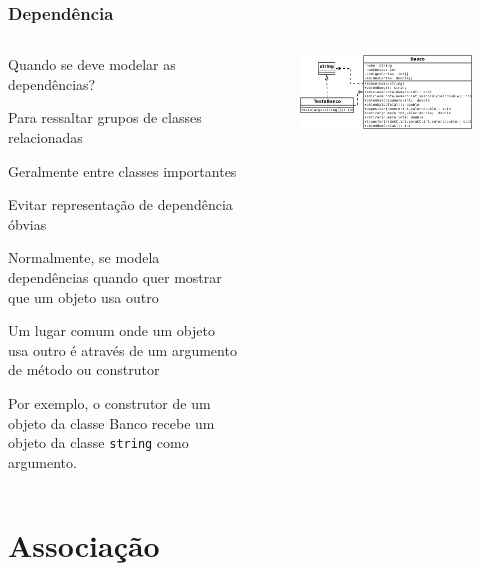 \documentclass[aspectratio=169]{beamer}
\begin{document}
\begin{frame}\frametitle{Dependência}
\begin{columns}
\begin{column}{0.45\linewidth}
\begin{itemize}
{\small
	\item Quando se deve modelar as dependências?
	\begin{itemize}
{\scriptsize
		\item Para ressaltar grupos de classes relacionadas
		\item Geralmente entre classes importantes
		\item Evitar representação de dependência óbvias
}
	\end{itemize}
	\item Normalmente, se modela dependências quando quer mostrar que um objeto usa outro
	\begin{itemize}
{\scriptsize
		\item Um lugar comum onde um objeto usa outro é através de um argumento de método ou construtor
		\item Por exemplo, o construtor de um objeto da classe Banco recebe um objeto da classe \texttt{string} como argumento.
}
	\end{itemize}
}
\end{itemize}
\end{column}
\begin{column}{0.55\linewidth}
		\begin{figure}[h]
			\includegraphics[height=0.35\paperheight]{imagens/dependencia2.png}
		\end{figure}
\end{column}
\end{columns}
\end{frame}

\section{Associação}
\end{document}
